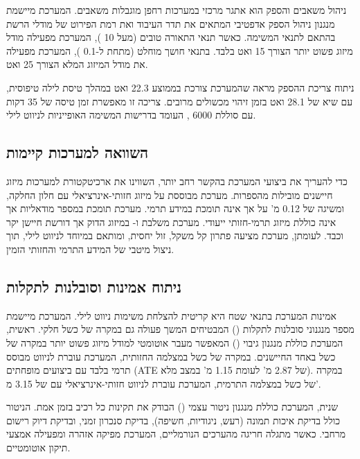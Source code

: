 ניהול משאבים והספק הוא אתגר מרכזי במערכות רחפן מוגבלות משאבים. המערכת מיישמת מנגנון ניהול הספק אדפטיבי המתאים את תדר העיבוד ואת רמת הפירוט של מודלי הרשת בהתאם לתנאי המשימה. כאשר תנאי התאורה טובים (מעל 10 ), המערכת מפעילה מודל מיזוג פשוט יותר הצורך 15 ואט בלבד. בתנאי חושך מוחלט (מתחת ל-0.1 ), המערכת מפעילה את מודל המיזוג המלא הצורך 25 ואט.

ניתוח צריכת ההספק מראה שהמערכת צורכת בממוצע 22.3 ואט במהלך טיסת לילה טיפוסית, עם שיא של 28.1 ואט בזמן זיהוי מכשולים מרובים. צריכה זו מאפשרת זמן טיסה של 35 דקות עם סוללת 6000 , העומד בדרישות המשימה האופייניות לניווט לילי.

\subsection{השוואה למערכות קיימות}
\label{sec:ch07_comparison}

כדי להעריך את ביצועי המערכת בהקשר רחב יותר, השווינו את ארכיטקטורת  למערכות מיזוג חיישנים מובילות מהספרות. מערכת  \cite{Kalman1960} מבוססת על מיזוג חזותי-אינרציאלי עם חלון החלקה, ומשיגה  של 0.12 מ' על  אך אינה תומכת במידע תרמי. מערכת  \cite{MurArtal2015ORB} תומכת במספר מודאליות אך אינה כוללת מיזוג תרמי-חזותי ייעודי. מערכת  \cite{Zhang2014LOAM} משלבת  ו- במיזוג הדוק אך דורשת חיישן  יקר וכבד. לעומתן, מערכת  מציעה פתרון קל משקל, זול יחסית, ומותאם במיוחד לניווט לילי, תוך ניצול מיטבי של המידע התרמי והחזותי הזמין.

\subsection{ניתוח אמינות וסובלנות לתקלות}
\label{sec:ch07_reliability}

אמינות המערכת בתנאי שטח היא קריטית להצלחת משימות ניווט לילי. המערכת מיישמת מספר מנגנוני סובלנות לתקלות () המבטיחים המשך פעולה גם במקרה של כשל חלקי. ראשית, המערכת כוללת מנגנון גיבוי () המאפשר מעבר אוטומטי למודל מיזוג פשוט יותר במקרה של כשל באחד החיישנים. במקרה של כשל במצלמה החזותית, המערכת עוברת לניווט מבוסס תרמי בלבד עם ביצועים מופחתים (ATE של 2.87 מ' לעומת 1.15 מ' במצב מלא). במקרה של כשל במצלמה התרמית, המערכת עוברת לניווט חזותי-אינרציאלי עם  של 3.15 מ'.

שנית, המערכת כוללת מנגנון ניטור עצמי () הבודק את תקינות כל רכיב בזמן אמת. הניטור כולל בדיקת איכות תמונה (רעש, ניגודיות, חשיפה), בדיקת סנכרון זמני, ובדיקת דיוק רישום מרחבי. כאשר מתגלה חריגה מהערכים הנורמליים, המערכת מפיקה אזהרה ומפעילה אמצעי תיקון אוטומטיים.

